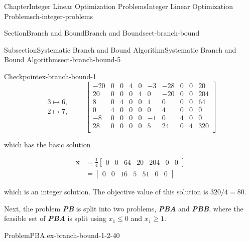 \documentclass[oneside,10pt,]{book}
\newcommand{\alert}[1]{\textbf{\textit{#1}}}
\numberwithin{equation}{section}
\newcommand{\amp}{&}
\begin{document}
\begin{chapterptx}{Chapter}{Integer Linear Optimization Problems}{}{Integer Linear Optimization Problems}{}{}{ch-integer-problems}
\begin{sectionptx}{Section}{Branch and Bound}{}{Branch and Bound}{}{}{sect-branch-bound}
\begin{subsectionptx}{Subsection}{Systematic Branch and Bound Algorithm}{}{Systematic Branch and Bound Algorithm}{}{}{sect-branch-bound-5}
\begin{inlineexercise}{Checkpoint}{}{ex-branch-bound-1}
\begin{equation*}
\begin{array}{r} 3 \mapsto 6, \\ 2 \mapsto 7,  \end{array} \qquad \left[\begin{array}{rrr|rrrrrr|r} -20 \amp 0 \amp 0 \amp 4 \amp 0 \amp -3 \amp -28 \amp 0 \amp 0 \amp 20\\ 20 \amp 0 \amp 0 \amp 0 \amp 4 \amp 0 \amp -20 \amp 0 \amp 0 \amp 204\\ 8 \amp 0 \amp 4 \amp 0 \amp 0 \amp 1 \amp 0 \amp 0 \amp 0 \amp 64\\ 0 \amp 4 \amp 0 \amp 0 \amp 0 \amp 0 \amp 4 \amp 0 \amp 0 \amp 0\\ -8 \amp 0 \amp 0 \amp 0 \amp 0 \amp -1 \amp 0 \amp 4 \amp 0 \amp 0\\ \hline 28 \amp 0 \amp 0 \amp 0 \amp 0 \amp 5 \amp 24 \amp 0 \amp 4 \amp 320\\ \end{array} \right]
\end{equation*}
%
\par
which has the basic solution%
\par
%
\begin{equation*}
\begin{aligned} \boldsymbol{x} \amp = \frac{1}{4} \left[\begin{array}{rrr|rrrrr} 0 \amp 0 \amp 64 \amp 20 \amp 204 \amp 0 \amp 0 \end{array}\right] \\ \amp = \left[\begin{array}{rrr|rrrr} 0 \amp 0 \amp 16 \amp 5 \amp 51 \amp 0 \amp 0 \end{array}\right] \end{aligned}
\end{equation*}
%
\par
which is an integer solution. The objective value of this solution is \(320/4=80\).%
\par
Next, the problem \alert{PB} is split into two problems, \alert{PBA} and \alert{PBB}, where the feasible set of \alert{PBA} is split using \(x_1 \leq 0\) and \(x_1 \geq 1\).%
\begin{problem}{Problem}{PBA.}{ex-branch-bound-1-2-40}%
%
\begin{equation*}

\end{equation*}
\end{problem}
\end{inlineexercise}
\end{subsectionptx}
\end{sectionptx}
\end{chapterptx}
\end{document}
